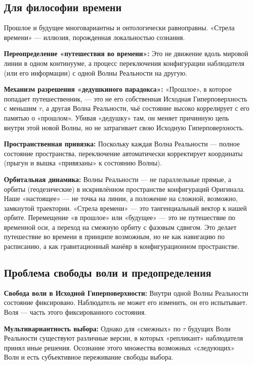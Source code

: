 \documentclass[a4paper,12pt]{article}
\begin{document}
\subsection{Для философии времени}

Прошлое и будущее многовариантны и онтологически равноправны. «Стрела времени» — иллюзия, порожденная локальностью сознания.

\textbf{Переопределение «путешествия во времени»:} Это не движение вдоль мировой линии в одном континууме, а процесс переключения конфигурации наблюдателя (или его информации) с одной Волны Реальности на другую.

\textbf{Механизм разрешения «дедушкиного парадокса»:} «Прошлое», в которое попадает путешественник, — это не его собственная Исходная Гиперповерхность с меньшим $\tau$, а другая Волна Реальности, чьё состояние высоко коррелирует с его памятью о «прошлом». Убивая «дедушку» там, он меняет причинную цепь внутри этой новой Волны, но не затрагивает свою Исходную Гиперповерхность.

\textbf{Пространственная привязка:} Поскольку каждая Волна Реальности — полное состояние пространства, переключение автоматически корректирует координаты (прыгун и вышка «привязаны» к состоянию Волны).

\textbf{Орбитальная динамика:} Волны Реальности — не параллельные прямые, а орбиты (геодезические) в искривлённом пространстве конфигураций Оригинала. Наше «настоящее» — не точка на линии, а положение на сложной, возможно, замкнутой траектории. «Стрела времени» — это тангенциальный вектор к нашей орбите. Перемещение «в прошлое» или «будущее» — это не путешествие по временной оси, а переход на смежную орбиту с фазовым сдвигом. Это делает путешествие во времени в принципе возможным, но не как навигацию по расписанию, а как гравитационный манёвр в конфигурационном пространстве.

\subsection{Проблема свободы воли и предопределения}

\textbf{Свобода воли в Исходной Гиперповерхности:} Внутри одной Волны Реальности состояние фиксировано. Наблюдатель не может его изменить, он его испытывает. Воля — часть этого фиксированного состояния.

\textbf{Мультивариантность выбора:} Однако для «смежных» по $\tau$ будущих Волн Реальности существуют различные версии, в которых «репликант» наблюдателя принял иные решения. Осознание этого множества возможных «следующих» Волн и есть субъективное переживание свободы выбора.
\end{document}
